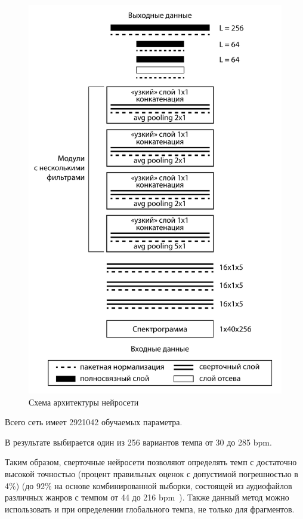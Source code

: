 \begin{figure}[h]
	\centering
	\includegraphics[scale=0.38]{svg/cnn.pdf}
	\caption{Схема архитектуры нейросети}
	\label{img:cnn}
\end{figure}

Всего сеть имеет 2921042 обучаемых параметра.

В результате выбирается один из 256 вариантов темпа от 30 до 285 bpm.

Таким образом, сверточные нейросети позволяют определять темп с достаточно высокой точностью (процент правильных оценок с допустимой погрешностью в 4\%) (до 92\% на основе комбинированной выборки, состоящей из аудиофайлов различных жанров с темпом от 44 до 216 bpm~\cite{cnn}). Также данный метод можно использовать и при определении глобального темпа, не только для фрагментов.

